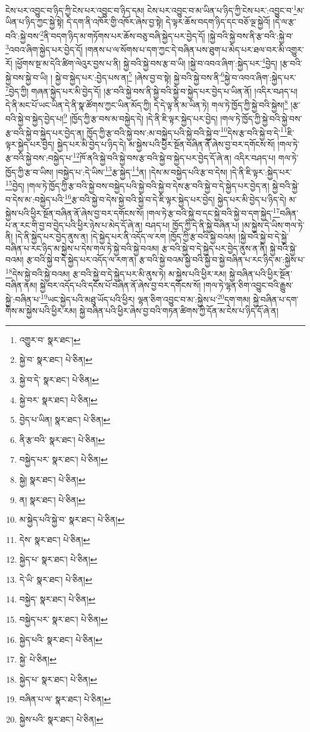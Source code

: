 ངེས་པར་འབྱུང་བ་ཉིད་ཀྱི་ངེས་པར་འབྱུང་བ་ཉིད་དམ། ངེས་པར་འབྱུང་བ་མ་ཡིན་པ་ཉིད་ཀྱི་ངེས་པར་:འབྱུང་བ་\footnote{འགྱུར་བ་  སྣར་ཐང་། }མ་ཡིན་པ་ཉིད་ཀྱང་སྐྱེ་སྟེ། དེ་དག་ནི་འཁོར་གྱི་འཁོར་ཞེས་བྱ་སྟེ། དེ་ལྟར་ཆོས་བདག་ཉིད་དང་བཅོ་ལྔ་སྐྱེའོ། །དེ་ལ་རྩ་བའི་:སྐྱེ་བས་\footnote{སྐྱེ་བ་  སྣར་ཐང་།  པེ་ཅིན། }ནི་བདག་ཉིད་མ་གཏོགས་པར་ཆོས་བཅུ་བཞི་སྐྱེད་པར་བྱེད་དོ། །སྐྱེ་བའི་སྐྱེ་བས་ནི་རྩ་བའི་:སྐྱེ་བ་\footnote{སྐྱེ་བ་དེ་  སྣར་ཐང་།  པེ་ཅིན། }འབའ་ཞིག་སྐྱེད་པར་བྱེད་དོ། །གནས་པ་ལ་སོགས་པ་དག་ཀྱང་དེ་བཞིན་པས་ཐུག་པ་མེད་པར་ཐལ་བར་མི་འགྱུར་རོ། །ཕྱོགས་སྔ་མ་དེའི་ཚིག་ལེའུར་བྱས་པ་ནི། སྐྱེ་བའི་སྐྱེ་བས་རྩ་བ་ཡི། །སྐྱེ་བ་འབའ་ཞིག་:སྐྱེད་པར་\footnote{སྐྱེ་བར་  སྣར་ཐང་།  པེ་ཅིན། }བྱེད། །རྩ་བའི་སྐྱེ་བས་སྐྱེ་བ་ཡི། །
སྐྱེ་བ་སྐྱེད་པར་:བྱེད་པས་ན།\footnote{བྱེད་པ་ཡིན།  སྣར་ཐང་།  པེ་ཅིན། } །ཞེས་བྱ་བ་སྟེ། སྐྱེ་བའི་སྐྱེ་བས་ནི་\footnote{ནི་རྩ་བའི་  སྣར་ཐང་།  པེ་ཅིན། }སྐྱེ་བ་འབའ་ཞིག་:སྐྱེད་པར་\footnote{བསྐྱེད་པར་  སྣར་ཐང་།  པེ་ཅིན། }བྱེད་ཀྱི། གཞན་སྐྱེད་པར་མི་བྱེད་དོ། །རྩ་བའི་སྐྱེ་བས་ནི་སྐྱེ་བའི་སྐྱེ་བ་སྐྱེད་པར་བྱེད་པ་ཡིན་ནོ། །འདིར་བཤད་པ། དེ་ནི་མང་པོ་ཡང་ཡིན་དེ་ནི་སྣ་ཚོགས་ཀྱང་ཡིན་མོད་ཀྱི། དེ་དེ་ལྟ་ནི་མ་ཡིན་ཏེ། གལ་ཏེ་ཁྱོད་ཀྱི་སྐྱེ་བའི་སྐྱེས།\footnote{སྐྱེ།  སྣར་ཐང་།  པེ་ཅིན། } །རྩ་བའི་སྐྱེ་བ་སྐྱེད་བྱེད་པ།\footnote{ན།  སྣར་ཐང་།  པེ་ཅིན། } །ཁྱོད་ཀྱི་རྩ་བས་མ་བསྐྱེད་དེ། །དེ་ནི་ཇི་ལྟར་སྐྱེད་པར་བྱེད། །གལ་ཏེ་ཁྱོད་ཀྱི་སྐྱེ་བའི་སྐྱེ་བས་རྩ་བའི་སྐྱེ་བ་སྐྱེད་པར་བྱེད་ན། ཁྱོད་ཀྱི་རྩ་བའི་སྐྱེ་བས་:མ་བསྐྱེད་པའི་སྐྱེ་བའི་སྐྱེ་བ་\footnote{མ་སྐྱེད་པའི་སྐྱེ་བ་  སྣར་ཐང་།  པེ་ཅིན། }དེས་རྩ་བའི་སྐྱེ་བ་དེ་\footnote{དེས་  སྣར་ཐང་།  པེ་ཅིན། }ཇི་ལྟར་སྐྱེད་པར་བྱེད། སྐྱེད་པར་མི་བྱེད་པ་ཉིད་དེ། མ་སྐྱེས་པའི་ཕྱིར་སྔོན་བཞིན་ནོ་ཞེས་བྱ་བར་དགོངས་སོ། །གལ་ཏེ་རྩ་བའི་སྐྱེ་བས་:བསྐྱེད་པ་\footnote{སྐྱེད་པ་  སྣར་ཐང་།  པེ་ཅིན། }ཁོ་ནའི་སྐྱེ་བའི་སྐྱེ་བས་རྩ་བའི་སྐྱེ་བ་སྐྱེད་པར་བྱེད་དོ་ཞེ་ན། འདིར་བཤད་པ། གལ་ཏེ་ཁྱོད་ཀྱི་རྩ་བ་ཡིས། །བསྐྱེད་པ་:དེ་ཡིས་\footnote{དེ་ཡི་  སྣར་ཐང་།  པེ་ཅིན། }རྩ་སྐྱེད་\footnote{བསྐྱེད་  སྣར་ཐང་།  པེ་ཅིན། }ན། །དེས་མ་བསྐྱེད་པའི་རྩ་བ་དེས། །དེ་ནི་ཇི་ལྟར་:སྐྱེད་པར་\footnote{བསྐྱེད་པར་  སྣར་ཐང་།  པེ་ཅིན། }བྱེད། །གལ་ཏེ་ཁྱོད་ཀྱི་རྩ་བའི་སྐྱེ་བས་བསྐྱེད་པའི་སྐྱེ་བའི་སྐྱེ་བ་དེས་རྩ་བའི་སྐྱེ་བ་དེ་སྐྱེད་པར་བྱེད་ན། སྐྱེ་བའི་སྐྱེ་བ་དེས་མ་:བསྐྱེད་པའི་\footnote{སྐྱེད་པའི་  སྣར་ཐང་།  པེ་ཅིན། }རྩ་བའི་སྐྱེ་བ་དེས་སྐྱེ་བའི་སྐྱེ་བ་དེ་ཇི་ལྟར་སྐྱེད་པར་བྱེད། སྐྱེད་པར་མི་བྱེད་པ་ཉིད་དེ། མ་སྐྱེས་པའི་ཕྱིར་སྔོན་བཞིན་ནོ་ཞེས་བྱ་བར་དགོངས་སོ། །གལ་ཏེ་རྩ་བའི་སྐྱེ་བ་དང་སྐྱེ་བའི་སྐྱེ་བ་དག་སྐྱེད་\footnote{སྐྱེ་  པེ་ཅིན། }བཞིན་པ་ན་རང་གི་བྱ་བ་བྱེད་པའི་ཕྱིར་ཉེས་པ་མེད་དོ་ཞེ་ན། བཤད་པ། ཁྱོད་ཀྱི་དེ་ནི་སྐྱེ་བཞིན་པ། །མ་སྐྱེས་དེ་ཡིས་གལ་ཏེ་ནི། །དེ་ནི་སྐྱེད་པར་བྱེད་ནུས་ན། །དེ་སྐྱེད་པར་ནི་འདོད་ལ་རག །ཁྱོད་ཀྱི་རྩ་བའི་སྐྱེ་བའམ། །སྐྱེ་བའི་སྐྱེ་བ་དེ་སྐྱེ་བཞིན་པ་རང་ཉིད་མ་སྐྱེས་པ་དེས་གལ་ཏེ་སྐྱེ་བའི་སྐྱེ་བའམ། རྩ་བའི་སྐྱེ་བ་དེ་སྐྱེད་པར་བྱེད་ནུས་ན་ནི། སྐྱེ་བའི་སྐྱེ་བའམ། རྩ་བའི་སྐྱེ་བ་དེ་སྐྱེད་པར་འདོད་ལ་རག་ན། རྩ་བའི་སྐྱེ་བའམ་སྐྱེ་བའི་སྐྱེ་བ་སྐྱེ་བཞིན་པ་རང་ཉིད་མ་:སྐྱེས་པ་\footnote{སྐྱེད་པ་  སྣར་ཐང་།  པེ་ཅིན། }དེས་སྐྱེ་བའི་སྐྱེ་བའམ། རྩ་བའི་སྐྱེ་བ་དེ་སྐྱེད་པར་མི་ནུས་ཏེ། མ་སྐྱེས་པའི་ཕྱིར་རམ། སྐྱེ་བཞིན་པའི་ཕྱིར་སྔོན་བཞིན་ནམ། སྐྱེ་བར་འདོད་པའི་དངོས་པོ་བཞིན་ནོ་ཞེས་བྱ་བར་དགོངས་སོ། །གལ་ཏེ་ལྷན་ཅིག་འབྱུང་བའི་རྒྱུས་སྐྱེ་:བཞིན་པ་\footnote{བཞིན་པ་ལ་  སྣར་ཐང་།  པེ་ཅིན། }ཡང་སྐྱེད་པའི་མཐུ་ཡོད་པའི་ཕྱིར། ལྷན་ཅིག་འབྱུང་བ་མ་:སྐྱེས་པ་\footnote{སྐྱེས་པའི་  སྣར་ཐང་།  པེ་ཅིན། }དག་གམ། སྐྱེ་བཞིན་པ་དག་གིས་མ་སྐྱེས་པའི་ཕྱིར་རམ། སྐྱེ་བཞིན་པའི་ཕྱིར་ཞེས་བྱ་བའི་གཏན་ཚིགས་ཀྱི་དོན་མ་ངེས་པ་ཉིད་དོ་ཞེ་ན། 